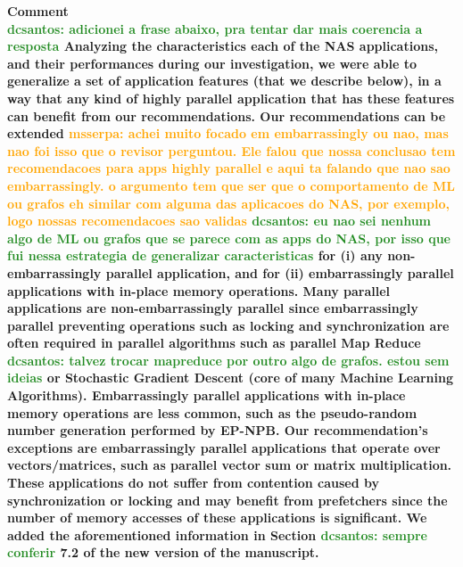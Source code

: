 \documentclass{article}
\newcounter{answer}
\newenvironment{answer}
{ \refstepcounter{answer}\vspace{0.5cm}\bfseries\noindent Comment~\theanswer\\ }
{ \vspace{0.5cm} }
\newcommand{\ms}[1]{\textcolor{orange}{\textbf{ msserpa: #1} }\vspace{0.2cm}}
\newcommand{\dcs}[1]{\textcolor{ForestGreen}{\textbf{dcsantos: #1} }\vspace{0.2cm}}
\begin{document}
\begin{answer}

\dcs{adicionei a frase abaixo, pra tentar dar mais coerencia a resposta}
Analyzing the characteristics each of the NAS applications, and their performances during our investigation, we were able to generalize a set of application features (that we describe below), in a way that any kind of highly parallel application that has these features can benefit from our recommendations.  Our recommendations can be extended \ms{achei muito focado em embarrassingly ou nao, mas nao foi isso que o revisor perguntou. Ele falou que nossa conclusao tem recomendacoes para apps highly parallel e aqui ta falando que nao sao embarrassingly. o argumento tem que ser que o comportamento de ML ou grafos eh similar com alguma das aplicacoes do NAS, por exemplo, logo nossas recomendacoes sao validas} \dcs{eu nao sei nenhum algo de ML ou grafos que se parece com as apps do NAS, por isso que fui nessa estrategia de generalizar caracteristicas} for (i) any non-embarrassingly parallel application, and for (ii) embarrassingly parallel applications with in-place memory operations. Many parallel applications are non-embarrassingly parallel since embarrassingly parallel preventing operations such as locking and synchronization are often required in parallel algorithms such as parallel Map Reduce \dcs{talvez trocar mapreduce por outro algo de grafos. estou sem ideias} or Stochastic Gradient Descent (core of many Machine Learning Algorithms). Embarrassingly parallel applications with in-place memory operations are less common, such as the pseudo-random number generation performed by EP-NPB. Our recommendation's exceptions are embarrassingly parallel applications that operate over vectors/matrices, such as parallel vector sum or matrix multiplication. These applications do not suffer from contention caused by synchronization or locking and may benefit from prefetchers since the number of memory accesses of these applications is significant. We added the aforementioned information in Section \dcs{sempre conferir}7.2 of the new version of the manuscript.
\end{answer}
\end{document}
